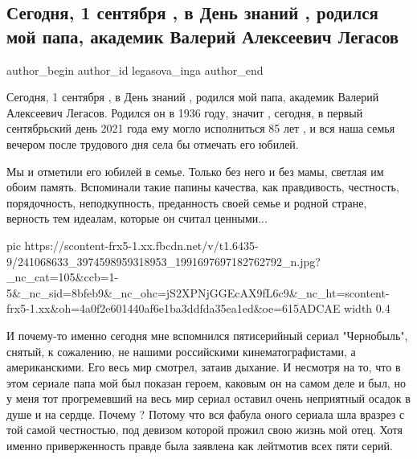  
 
 
 
 
 
\subsection{Сегодня, 1 сентября , в День знаний , родился мой папа, академик Валерий Алексеевич Легасов}
\label{sec:01_09_2021.fb.legasova_inga.1.birthday_valerij_legasov}
 
\ifcmt
 author_begin
   author_id legasova_inga
 author_end
\fi

Сегодня, 1 сентября , в День знаний , родился мой папа, академик Валерий
Алексеевич Легасов. Родился он в 1936 году, значит , сегодня, в первый
сентябрьский день 2021 года ему могло исполниться 85 лет , и вся наша семья
вечером после трудового дня села бы отмечать его юбилей. 

Мы и отметили его юбилей в семье. Только без него и без мамы, светлая им обоим
память. Вспоминали такие папины качества, как правдивость, честность,
порядочность, неподкупность, преданность своей семье и родной стране, верность
тем идеалам, которые он считал ценными...  

\ifcmt
  pic https://scontent-frx5-1.xx.fbcdn.net/v/t1.6435-9/241068633_3974598959318953_1991697697182762792_n.jpg?_nc_cat=105&ccb=1-5&_nc_sid=8bfeb9&_nc_ohc=jS2XPNjGGEcAX9fL6c9&_nc_ht=scontent-frx5-1.xx&oh=4a0f2e601440af6e1ba3ddfda35ea1ed&oe=615ADCAE
  width 0.4
\fi

И почему-то именно сегодня мне вспомнился пятисерийный сериал "Чернобыль",
снятый, к сожалению, не нашими российскими кинематографистами, а американскими.
Его весь мир смотрел, затаив дыхание. И несмотря на то, что в этом сериале папа
мой был показан героем, каковым он на самом деле и был, но у меня тот
прогремевший на весь мир сериал оставил очень неприятный осадок в душе и на
сердце. Почему ? Потому что вся фабула оного сериала шла вразрез с той самой
честностью, под девизом которой прожил свою жизнь мой отец. Хотя именно
приверженность правде была заявлена как лейтмотив всех пяти серий. 

